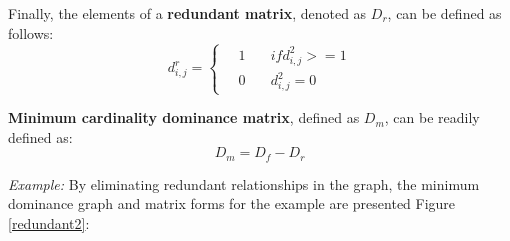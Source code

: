 \documentclass[12pt,english]{report}
\begin{document}
Finally, the elements of a \textbf{redundant matrix}, denoted as $ D_r$, can be defined as follows: 
\begin{equation}
d^{r}_{i,j} =
  \begin{cases}
  \quad  1   & \quad if d^{2}_{i,j} >= 1 \\
  \quad  0  & \quad d^{2}_{i,j} = 0 
  \end{cases}	
\end{equation}

\textbf{Minimum cardinality dominance matrix}, defined as $D_m$, can be readily defined as:
$$D_m = D_f - D_r $$
 
\textit{Example:} By eliminating redundant relationships in the graph, the minimum dominance graph and matrix forms for the example are presented Figure \ref{redundant2}:





\begin{figure}
	\begin{floatrow}
	\capbtabbox{%
	\begin{tabular}{l|llllll}
		& 1 & 2 & 3 & 4 & 5 & 6 \\ \hline
		1 & 0 & 0 & 0 & 0 & 0 & 0 \\
		2 & 1 & 0 & 0 & 1 & 1 & 0 \\
		3 & 0 & 1 & 0 & 0 & 0 & 0 \\
		4 & 0 & 0 & 0 & 0 & 0 & 0 \\
		5 & 0 & 0 & 0 & 0 & 0 & 0 \\
		6 & 0 & 1 & 0 & 0 & 0 & 0
	\end{tabular}
		\label{domin_matrix3}%
	}{%
	\caption{Minimum Dominance in Matrix}%
	\label{redundant2}
}
\end{floatrow}
\end{figure}
\end{document}
